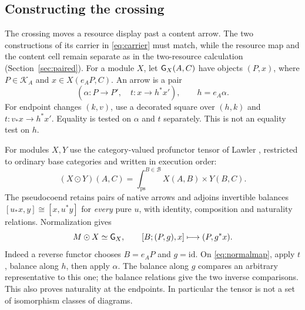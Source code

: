 \documentclass[11pt]{article}
\numberwithin{equation}{section}
\theoremstyle{definition}\newtheorem{definition}[theorem]{Definition}
\newcommand{\B}{\mathcal B}\newcommand{\J}{\mathcal J}
\newcommand{\K}{\mathcal K}\newcommand{\Lcat}{\mathcal L}
\newcommand{\id}{\mathrm{id}}\newcommand{\op}{\mathrm{op}}\newcommand{\dom}{\mathrm{dom}}\newcommand{\cod}{\mathrm{cod}}
\begin{document}
\subsection{Constructing the crossing}\label{sec:construction}
The crossing moves a resource display past a content arrow. The two
constructions of its carrier in \eqref{eq:carrier} must match, while
the resource map and the content cell remain separate as in the
two-resource calculation (Section~\ref{sec:paired}). For a module $X$, let $\mathsf G_X(A,C)$ have objects $(P,x)$,
where $P\in\K_A$ and $x\in X(e_AP,C)$. An arrow is a pair
\begin{equation}\label{eq:normalmap}
 (\alpha:P\to P',\quad t:x\to h^*x'),\qquad h=e_A\alpha.
\end{equation}
For endpoint changes $(k,v)$, use a decorated square over $(h,k)$ and
$t:v_*x\to h^*x'$. Equality is tested on $\alpha$ and $t$ separately.
This is not an equality test on $h$.

For modules $X,Y$ use the category-valued profunctor tensor of
Lawler \cite[Sec.~4.1.1, Eq.~(4.1.1)]{Lawler}, restricted to ordinary
base categories and written in execution order:
\[
 (X\odot Y)(A,C)=\int^{B\in\B}_{\mathrm{ps}}X(A,B)\times Y(B,C).
\]
The pseudocoend retains pairs of native arrows and adjoins invertible
balances $[u_*x,y]\cong[x,u^*y]$ for \emph{every} pure $u$, with
identity, composition and naturality relations. Normalization gives
\begin{equation}\label{eq:normal}
 M\odot X\simeq\mathsf G_X,
 \qquad [B;(P,g),x]\longmapsto(P,g^*x).
\end{equation}
Indeed a reverse functor chooses $B=e_AP$ and $g=\id$. On
\eqref{eq:normalmap}, apply $t$, balance along $h$, then apply $\alpha$.
The balance along $g$ compares an arbitrary representative to this one;
the balance relations give the two inverse comparisons. This also proves
naturality at the endpoints. In particular the tensor is not a set of
isomorphism classes of diagrams.
\end{document}
